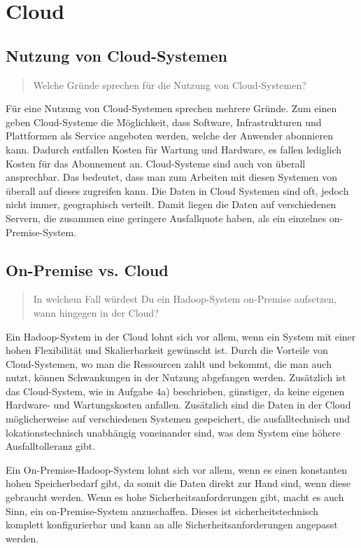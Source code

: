 \chapter{Cloud}

\section{Nutzung von Cloud-Systemen}
\begin{quote}
    Welche Gründe sprechen für die Nutzung von Cloud-Systemen?
\end{quote}
Für eine Nutzung von Cloud-Systemen sprechen mehrere Gründe. Zum einen geben Cloud-Systeme die Möglichkeit, dass Software, Infrastrukturen und Plattformen als Service angeboten werden, welche der Anwender abonnieren kann. Dadurch entfallen Kosten für Wartung und Hardware, es fallen lediglich Kosten für das Abonnement an. Cloud-Systeme sind auch von überall ansprechbar. Das bedeutet, dass man zum Arbeiten mit diesen Systemen von überall auf dieses zugreifen kann. Die Daten in Cloud Systemen sind oft, jedoch nicht immer, geographisch verteilt. Damit liegen die Daten auf verschiedenen Servern, die zusammen eine geringere Ausfallquote haben, als ein einzelnes on-Premise-System.

\section{On-Premise vs. Cloud}
\begin{quote}
    In welchem Fall würdest Du ein Hadoop-System on-Premise aufsetzen, wann hingegen in der Cloud?
\end{quote}
Ein Hadoop-System in der Cloud lohnt sich vor allem, wenn ein System mit einer hohen Flexibilität und Skalierbarkeit gewünscht ist. Durch die Vorteile von Cloud-Systemen, wo man die Ressourcen zahlt und bekommt, die man auch nutzt, können Schwankungen in der Nutzung abgefangen werden. Zusätzlich ist das Cloud-System, wie in Aufgabe 4a) beschrieben, günstiger, da keine eigenen Hardware- und Wartungskosten anfallen. Zusätzlich sind die Daten in der Cloud möglicherweise auf verschiedenen Systemen gespeichert, die ausfalltechnisch und lokationstechnisch unabhängig voneinander sind, was dem System eine höhere Ausfalltolleranz gibt. 

Ein On-Premise-Hadoop-System lohnt sich vor allem, wenn es einen konstanten hohen Speicherbedarf gibt, da somit die Daten direkt zur Hand sind, wenn diese gebraucht werden. Wenn es hohe Sicherheitsanforderungen gibt, macht es auch Sinn, ein on-Premise-System anzuschaffen. Dieses ist sicherheitstechnisch komplett konfigurierbar und kann an alle Sicherheitsanforderungen angepasst werden.

